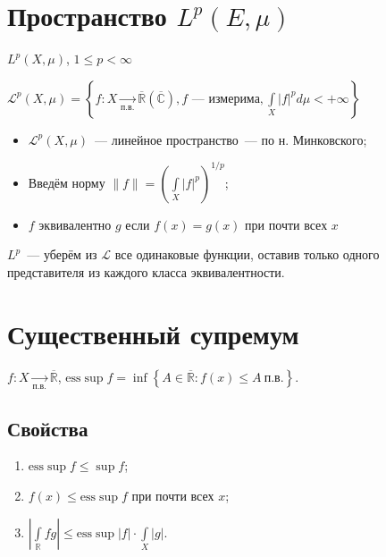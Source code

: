 \documentclass{article}
\begin{document}
    \newpage
    
    \section{Пространство $L^p(E,\mu)$}
    
        $L^p(X, \mu)$, $1 \leqslant p < \infty$
        
        $\mathcal{L}^p (X, \mu) = \left\{ f : X \xrightarrow[\text{п.в.}]{} \overline{\mathbb{R}} (\overline{\mathbb{C}}), f \text{~--- измерима}, \int\limits_X |f|^p d \mu < +\infty \right\}$
        
        \begin{itemize}
            
            \item $\mathcal{L}^p (X, \mu)$~--- линейное пространство~--- по н. Минковского;
            
            \item Введём норму $\| f \| = \left( \int\limits_X |f|^p \right)^{1/p}$;
            
            \item $f$ эквивалентно $g$ если $f(x) = g(x)$ при почти всех $x$
                
        \end{itemize}
        
        $L^p$~--- уберём из $\mathcal{L}$ все одинаковые функции, оставив только одного представителя из каждого класса эквивалентности.
            
    \newpage
    
    \section{Существенный супремум}
    
    $f : X \xrightarrow[\text{п.в.}]{} \overline{\mathbb{R}}$, $\mathrm{ess}\sup f = \inf \left\{ A \in \overline{\mathbb{R}} : f(x) \leqslant A \ \text{п.в.} \right\}$.
    
        \subsection{Свойства}
    
            \begin{enumerate}
        
                \item $\mathrm{ess} \sup f \leqslant \sup f$;
            
                \item $f(x) \leqslant \mathrm{ess} \sup f$ при почти всех $x$;
            
                \item $\left| \int\limits_\mathbb{R} fg \right| \leqslant \mathrm{ess} \sup |f| \cdot \int\limits_X |g|$.
            
            \end{enumerate}
        
\end{document}
